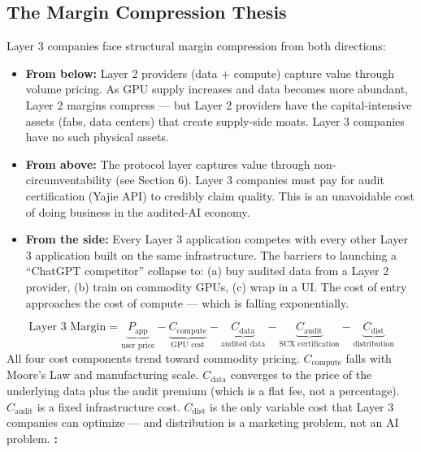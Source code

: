 \documentclass[12pt,a4paper]{article}
\theoremstyle{remark}
\begin{document}
\subsection{The Margin Compression Thesis}
Layer 3 companies face structural margin compression from both directions:
\begin{itemize}
 \item \textbf{From below:} Layer 2 providers (data + compute) capture value 
 through volume pricing. As GPU supply increases and data becomes more 
 abundant, Layer 2 margins compress --- but Layer 2 providers have the 
 capital-intensive assets (fabs, data centers) that create supply-side 
 moats. Layer 3 companies have no such physical assets.
 \item \textbf{From above:} The protocol layer captures value through 
 non-circumventability (see Section 6). Layer 3 companies must pay 
 for audit certification (Yajie API) to credibly claim quality. 
 This is an unavoidable cost of doing business in the audited-AI economy.
 \item \textbf{From the side:} Every Layer 3 application competes with every 
 other Layer 3 application built on the same infrastructure. The barriers 
 to launching a ``ChatGPT competitor'' collapse to: (a) buy audited data 
 from a Layer 2 provider, (b) train on commodity GPUs, (c) wrap in a UI. 
 The cost of entry approaches the cost of compute --- which is falling 
 exponentially.
\end{itemize}
\begin{equation}
\text{Layer 3 Margin} = \underbrace{P_{\text{app}}}_{\text{user price}} 
 - \underbrace{C_{\text{compute}}}_{\text{GPU cost}} 
 - \underbrace{C_{\text{data}}}_{\text{audited data}} 
 - \underbrace{C_{\text{audit}}}_{\text{SCX certification}} 
 - \underbrace{C_{\text{dist}}}_{\text{distribution}}
\end{equation}
All four cost components trend toward commodity pricing. $C_{\text{compute}}$ 
falls with Moore's Law and manufacturing scale. $C_{\text{data}}$ converges 
to the price of the underlying data plus the audit premium (which is a flat 
fee, not a percentage). $C_{\text{audit}}$ is a fixed infrastructure cost. 
$C_{\text{dist}}$ is the only variable cost that Layer 3 companies can 
optimize --- and distribution is a marketing problem, not an AI problem.
\noindent\textbf{: }
\end{document}
